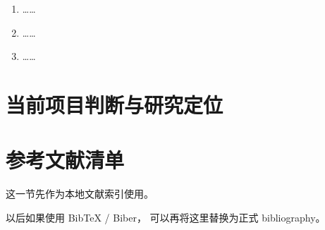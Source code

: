 \documentclass[11pt, oneside]{article}
\begin{document}
\begin{enumerate}
	\item ……
	\item ……
	\item ……
\end{enumerate}

\section{当前项目判断与研究定位}

\section{参考文献清单}

这一节先作为本地文献索引使用。

以后如果使用 BibTeX / Biber，
可以再将这里替换为正式 bibliography。
\end{document}
